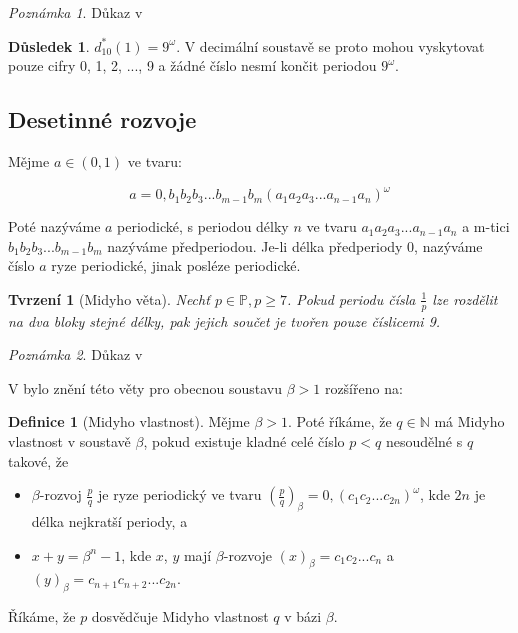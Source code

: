 \documentclass{article}
\newtheorem{theorem}{Tvrzení}
\theoremstyle{definition}
\theoremstyle{definition}
\newtheorem{definice}{Definice}[section]
\newtheorem{corollary}{Důsledek}[theorem]
\theoremstyle{remark}
\newtheorem*{pozn}{Poznámka}
\numberwithin{equation}{section}
\begin{document}
\begin{pozn}
	Důkaz v \cite{Parry}
\end{pozn}

\begin{corollary}
	$d^\ast_{10}(1) = 9^\omega$. V decimální soustavě se proto mohou vyskytovat pouze cifry 0, 1, 2, ..., 9 a žádné číslo nesmí končit periodou $9^\omega$.
\end{corollary}

\subsection{Desetinné rozvoje}

Mějme $a \in (0, 1)$ ve tvaru:

\[
	a = 0,b_1b_2b_3...b_{m-1}b_m(a_1a_2a_3...a_{n - 1}a_n)^\omega
\]

Poté nazýváme $a$ periodické, s periodou délky $n$ ve tvaru $a_1a_2a_3...a_{n - 1}a_n$ a m-tici $b_1b_2b_3...b_{m-1}b_m$ nazýváme předperiodou. Je-li délka předperiody 0, nazýváme číslo $a$ ryze periodické, jinak posléze periodické.

\begin{theorem}[Midyho věta]
	Nechť $p \in \mathbb{P}, p \geq 7$. Pokud periodu čísla $\frac{1}{p}$ lze rozdělit na dva bloky stejné délky, pak jejich součet je tvořen pouze číslicemi 9.
\end{theorem}

\begin{pozn}
	Důkaz v \cite{RMF}
\end{pozn}

V \cite{Midy} bylo znění této věty pro obecnou soustavu $\beta > 1$ rozšířeno na:

\begin{definice}[Midyho vlastnost]
	Mějme $\beta > 1$. Poté říkáme, že $q \in \mathbb{N}$ má Midyho vlastnost v soustavě $\beta$, pokud existuje kladné celé číslo $p < q$ nesoudělné s $q$ takové, že
	\begin{itemize}
		\item $\beta$-rozvoj $\frac{p}{q}$ je ryze periodický ve tvaru $(\frac{p}{q})_\beta = 0,(c_1c_2...c_{2n})^\omega$, kde $2n$ je délka nejkratší periody, a
		\item $x + y = \beta^n - 1$, kde $x$, $y$ mají $\beta$-rozvoje $(x)_\beta = c_1c_2...c_n$ a $(y)_\beta = c_{n + 1}c_{n + 2}...c_{2n}$.
	\end{itemize}
	Říkáme, že $p$ dosvědčuje Midyho vlastnost $q$ v bázi $\beta$.
\end{definice}
\end{document}
